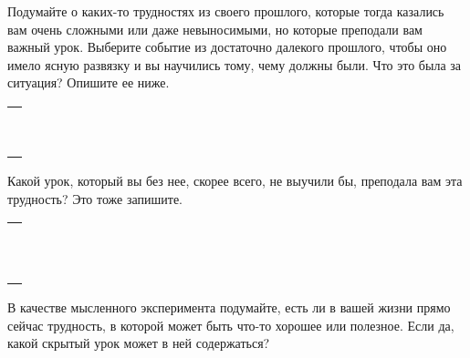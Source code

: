 \begin{itemize}
	\itemWritingHand Подумайте о каких-то трудностях из своего прошлого, которые тогда казались вам очень сложными или даже невыносимыми, но которые преподали вам важный урок. Выберите событие из достаточно далекого прошлого, чтобы оно имело ясную развязку и вы научились тому, чему должны были. Что это была за ситуация? Опишите ее ниже. 
\end{itemize}
\setlength{\extrarowheight}{2mm}
\begin{tabularx}{\textwidth}{X}
	\\
	\arrayrulecolor{gray}\hline\\
	\hline\\
	\hline\\
	\hline\\
	\hline\\
	\hline\\	
	\hline\\
	\hline\\
	\hline\\
	\hline\\
\end{tabularx}
\setlength{\extrarowheight}{0mm}
\begin{itemize}
	\itemWritingHand Какой урок, который вы без нее, скорее всего, не выучили бы, преподала вам эта трудность? Это тоже запишите.
\end{itemize}
\setlength{\extrarowheight}{2mm}
\begin{tabularx}{\textwidth}{X}
	\\
	\arrayrulecolor{gray}\hline\\
	\hline\\
	\hline\\
	\hline\\
	\hline\\
	\hline\\	
	\hline\\
	\hline\\
	\hline\\
	\hline\\
	\hline\\
	\hline\\
\end{tabularx}
\setlength{\extrarowheight}{0mm}
\begin{itemize}
	\itemWritingHand В качестве мысленного эксперимента подумайте, есть ли в вашей жизни  прямо сейчас трудность, в которой может быть что-то хорошее или полезное. Если да, какой скрытый урок может в ней содержаться?
\end{itemize}
